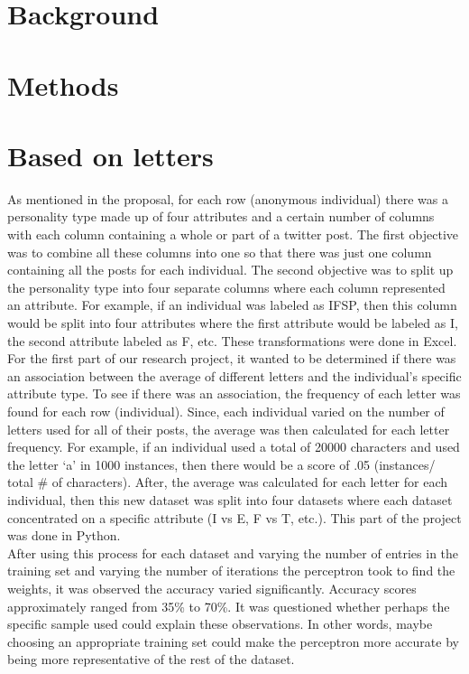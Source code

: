 \documentclass{article}
\begin{document}
\section{Background}
\section{Methods}

\section{Based on letters}
As mentioned in the proposal, for each row (anonymous individual) there was a personality type made up of four attributes and a certain number of columns with each column containing a whole or part of a twitter post. The first objective was to combine all these columns into one so that there was just one column containing all the posts for each individual. The second objective was to split up the personality type into four separate columns where each column represented an attribute. For example, if an individual was labeled as IFSP, then this column would be split into four attributes where the first attribute would be labeled as I, the second attribute labeled as F, etc. These transformations were done in Excel.\\
For the first part of our research project, it wanted to be determined if there was an association between the average of different letters and the individual’s specific attribute type. To see if there was an association, the frequency of each letter was found for each row (individual). Since, each individual varied on the number of letters used for all of their posts, the average was then calculated for each letter frequency. For example, if an individual used a total of 20000 characters and used the letter ‘a’ in 1000 instances, then there would be a score of .05 (instances/ total \# of characters). After, the average was calculated for each letter for each individual, then this new dataset was split into four datasets where each dataset concentrated on a specific attribute (I vs E, F vs T, etc.). This part of the project was done in Python.
\\
After using this process for each dataset and varying the number of entries in the training set and varying the number of iterations the perceptron took to find the weights, it was observed the accuracy varied significantly. Accuracy scores approximately ranged from 35\% to 70\%. It was questioned whether perhaps the specific sample used could explain these observations. In other words, maybe choosing an appropriate training set could make the perceptron more accurate by being more representative of the rest of the dataset.
\end{document}

